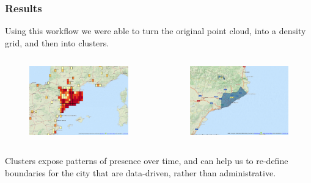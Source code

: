 \documentclass[hyperref={pdfpagelabels=true}]{beamer}
\begin{document}
\begin{frame}
\frametitle{Results}
Using this workflow we were able to turn the original point cloud, into a density grid, and then into clusters.
\begin{columns}
  \begin{column}{0.5\textwidth}
      \begin{figure}       
	\includegraphics[width=\textwidth]{heatmap_hive.png}      
     \end{figure}
  \end{column}
  \begin{column}{0.5\textwidth}
    \begin{figure}       
	\includegraphics[width=\textwidth]{clusters_hive.png}      
     \end{figure}
  \end{column}  
\end{columns}
      \vspace{5mm}  
Clusters expose patterns of presence over time, and can help us to re-define boundaries for the city that are data-driven, rather than administrative.%
\end{frame}
\end{document}
